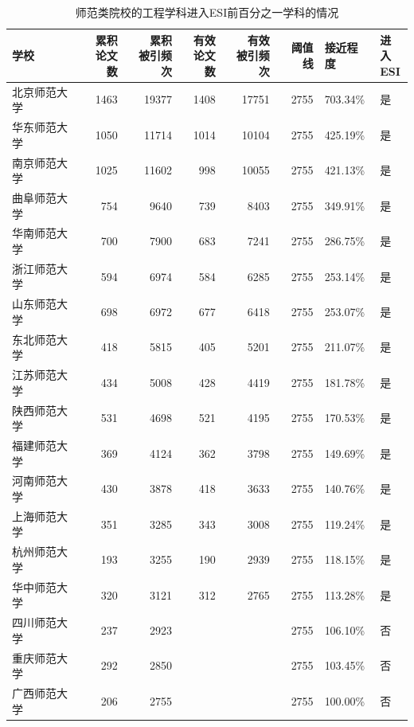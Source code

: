 \documentclass[cn, 11pt, fancy, hide]{elegantbook}
\begin{document}
\begin{table}[!h]

\caption{\label{tab:unnamed-chunk-21}师范类院校的工程学科进入ESI前百分之一学科的情况}
\centering
\begin{tabular}[t]{lrrrrrll}
\toprule
学校 & \makecell[c]{累积 \\ 论文数} & \makecell[c]{累积 \\ 被引频次} & \makecell[c]{有效 \\ 论文数} & \makecell[c]{有效 \\ 被引频次} & 阈值线 & 接近程度 & \makecell[c]{进入 \\ ESI}\\
\midrule
北京师范大学 & 1463 & 19377 & 1408 & 17751 & 2755 & 703.34\% & 是\\
华东师范大学 & 1050 & 11714 & 1014 & 10104 & 2755 & 425.19\% & 是\\
南京师范大学 & 1025 & 11602 & 998 & 10055 & 2755 & 421.13\% & 是\\
曲阜师范大学 & 754 & 9640 & 739 & 8403 & 2755 & 349.91\% & 是\\
华南师范大学 & 700 & 7900 & 683 & 7241 & 2755 & 286.75\% & 是\\
\addlinespace
浙江师范大学 & 594 & 6974 & 584 & 6285 & 2755 & 253.14\% & 是\\
山东师范大学 & 698 & 6972 & 677 & 6418 & 2755 & 253.07\% & 是\\
东北师范大学 & 418 & 5815 & 405 & 5201 & 2755 & 211.07\% & 是\\
江苏师范大学 & 434 & 5008 & 428 & 4419 & 2755 & 181.78\% & 是\\
陕西师范大学 & 531 & 4698 & 521 & 4195 & 2755 & 170.53\% & 是\\
\addlinespace
福建师范大学 & 369 & 4124 & 362 & 3798 & 2755 & 149.69\% & 是\\
河南师范大学 & 430 & 3878 & 418 & 3633 & 2755 & 140.76\% & 是\\
上海师范大学 & 351 & 3285 & 343 & 3008 & 2755 & 119.24\% & 是\\
杭州师范大学 & 193 & 3255 & 190 & 2939 & 2755 & 118.15\% & 是\\
华中师范大学 & 320 & 3121 & 312 & 2765 & 2755 & 113.28\% & 是\\
\addlinespace
四川师范大学 & 237 & 2923 &  &  & 2755 & 106.10\% & 否\\
重庆师范大学 & 292 & 2850 &  &  & 2755 & 103.45\% & 否\\
广西师范大学 & 206 & 2755 &  &  & 2755 & 100.00\% & 否\\

\end{tabular}
\end{table}
\end{document}
